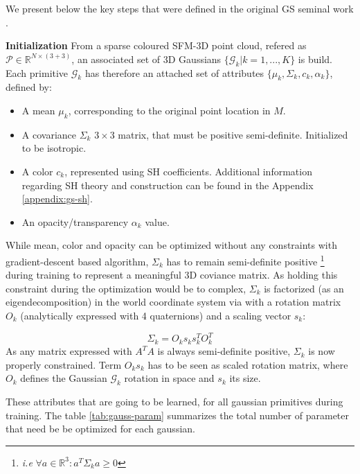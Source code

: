 We present below the key steps that were defined in the original \ac{GS} seminal work \citep{kerbl20233d}.

\noindent \textbf{Initialization} From a sparse coloured \ac{SFM}-3D point cloud, refered as $\mathcal{P}\in\mathbb{R}^{N\times(3+3)}$, an associated set of 3D Gaussians $\{\mathcal{G}_{k}|k=1,...,K\}$ is build. Each primitive $\mathcal{G}_{k} $ has therefore an attached set of attributes $\{\mu_{k},\Sigma_{k},c_{k},\alpha_{k}\}$, defined by: 
\begin{itemize}
    \item A mean $\mu_{k}$, corresponding to the original point location in $M$. 
    \item A covariance $\Sigma_{k}$ $3\times3$ matrix, that must be positive semi-definite. Initialized to be isotropic. 
    \item A color $c_{k}$, represented using \ac{SH} coefficients. Additional information regarding \ac{SH} theory and construction can be found in the Appendix \ref{appendix:gs-sh}. 
    \item An opacity/transparency $\alpha_{k}$ value. 
\end{itemize}

While mean, color and opacity can be optimized without any constraints with gradient-descent based algorithm, $\Sigma_{k}$ has to remain semi-definite positive \footnote{\textit{i.e} $ \forall a \in \mathbb{R}^{3}: a^{T}\Sigma_{k} a \geq 0$} during training to represent a meaningful 3D coviance matrix. As holding this constraint during the optimization would be to complex, $\Sigma_{k}$ is factorized (as an eigendecomposition) in the world coordinate system via with a rotation matrix $O_{k}$ (analytically expressed with 4 quaternions) and a scaling vector $s_{k}$: 

\begin{equation}
    \Sigma_{k} = O_{k}s_{k}s_{k}^{T}O_{k}^{T}
\end{equation}
As any matrix expressed with $A^{T}A$ is always semi-definite positive, $\Sigma_{k}$ is now properly constrained. Term $O_{k}s_{k}$ has to be seen as scaled rotation matrix, where $O_{k}$ defines the Gaussian $\mathcal{G}_{k}$ rotation in space and $s_{k}$ its size. 

These attributes that are going to be learned, for all gaussian primitives during training. The table \ref{tab:gauss-param} summarizes the total number of parameter that need be be optimized for each gaussian. 

